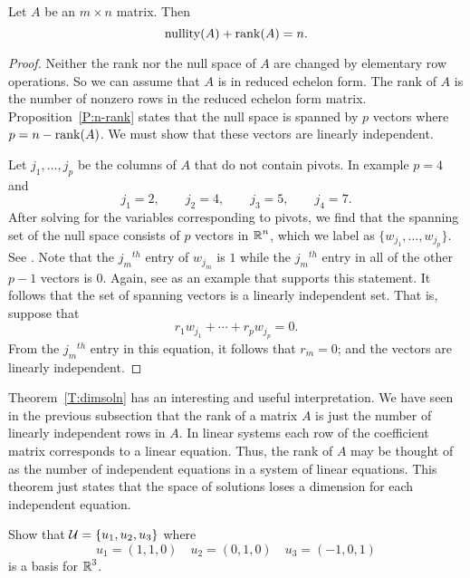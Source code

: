 \documentclass{ximera}
\begin{document}
\begin{theorem}  \label{T:dimsoln}
Let $A$ be an $m\times n$ matrix. Then
\[
{\rm nullity}(A) + {\rm rank}(A) = n.
\]
\end{theorem} 

\begin{proof}	Neither the rank nor the null space of $A$ are changed by
elementary row operations.  So we can assume that $A$ is in reduced
echelon form.  The rank of $A$ is the number of nonzero rows in
the reduced echelon form matrix.  Proposition~\ref{P:n-rank} states that
the null space is spanned by $p$ vectors where $p=n-{\rm rank}(A)$.  We
must show that these vectors are linearly independent.

Let $j_1,\ldots,j_p$ be the columns of $A$ that do not contain pivots.
In example  $p=4$ and
\[
j_1 = 2, \qquad j_2 = 4, \qquad j_3 = 5, \qquad j_4 = 7.
\]
After solving for the variables corresponding to pivots, we find that
the spanning set of the null space consists of $p$ vectors in $\mbox{$\Bbb{R}$}^n$,
which we label as $\{w_{j_1},\ldots,w_{j_p}\}$.  See .
Note that the $j_m$$^{th}$  entry of $w_{j_m}$ is $1$ while the
$j_m$$^{th}$ entry in all of the other $p-1$ vectors is $0$.  Again,
see  as an example that supports this statement.  It
follows that the set of spanning vectors is a linearly independent set.
That is, suppose that
\[
r_1w_{j_1} + \cdots + r_pw_{j_p} = 0.
\]
From the $j_m$$^{th}$ entry in this equation, it follows that $r_m=0$;
and the vectors are linearly independent.  \end{proof}

Theorem~\ref{T:dimsoln} has an interesting and useful interpretation.
We have seen in the previous subsection that the rank of a matrix $A$
is just the number of linearly independent rows in $A$.
In linear systems each row of the coefficient matrix corresponds
to a linear equation.  Thus, the rank of $A$ may be thought of as the
number of independent equations in a system of linear equations.
This theorem just states that the space of solutions loses a dimension
for each independent equation.


\EXER

\TEXER

\begin{exercise} \label{c5.5.1}
Show that ${\cal U}=\{u_1,u_2,u_3\}$ where
\[
u_1=(1,1,0) \quad u_2=(0,1,0) \quad u_3=(-1,0,1)
\]
is a basis for $\mbox{$\Bbb{R}$}^3$.
\end{exercise}
\end{document}
